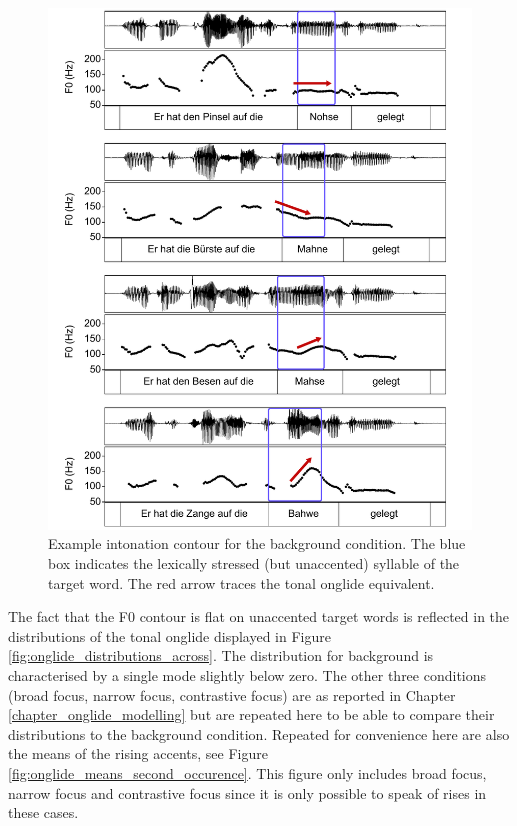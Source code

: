 \begin{figure}[t]
\includegraphics[width=\textwidth]{figures/ch7/intonation_contour_background.pdf}
\caption[Example intonation contour for the background condition.]{Example intonation contour for the background condition. The blue box indicates the lexically stressed (but unaccented) syllable of the target word. The red arrow traces the tonal onglide equivalent.}
\label{fig:contour_background}
\end{figure}

The fact that the F0 contour is flat on unaccented target words is reflected in the distributions of the tonal onglide displayed in Figure \ref{fig:onglide_distributions_across}. The distribution for background is characterised by a single mode slightly below zero. The other three conditions (broad focus, narrow focus, contrastive focus) are as reported in Chapter \ref{chapter_onglide_modelling} but are repeated here to be able to compare their distributions to the background condition. Repeated for convenience here are also the means of the rising accents, see Figure \ref{fig:onglide_means_second_occurence}. This figure only includes broad focus, narrow focus and contrastive focus since it is only possible to speak of rises in these cases. 

